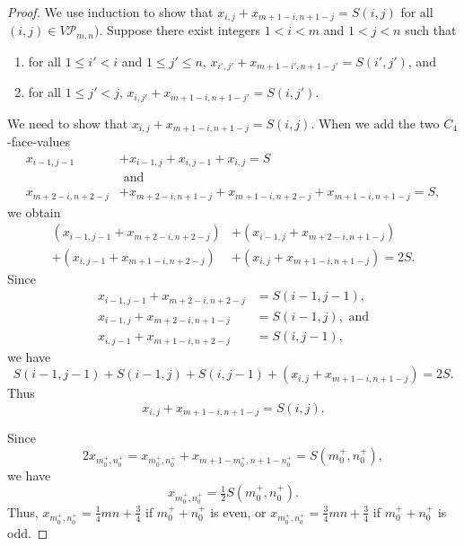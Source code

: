 \documentclass[12pt]{amsart}
\theoremstyle{definition}
\theoremstyle{plain}
\begin{document}
\begin{proof}
We use induction to show that $x_{i,j} + x_{m+1-i,n+1-j} = S(i,j)$ for all $(i,j)\in V\mathcal{P}_{m,n})$.
Suppose there exist integers $1 < i <m$ and $1 < j < n$ such that
\begin{enumerate}
  \item for all $1\leqslant i' <i$ and $1\leqslant j' \leqslant n$, $x_{i',j'} + x_{m+1-i',n+1-j'} = S(i',j')$, and
  \item for all $1\leqslant j' < j$, $x_{i,j'} + x_{m+1-i,n+1-j'} = S(i,j')$.
\end{enumerate}
We need to show that $x_{i,j} + x_{m+1-i,n+1-j} = S(i,j)$.
When we add the two $C_4$-face-values
\begin{align*}
  x_{i-1,j-1} &+ x_{i-1,j} + x_{i,j-1} + x_{i,j} = S \\
  &\mbox{ and } \\
  x_{m+2-i,n+2-j} &+ x_{m+2-i,n+1-j} + x_{m+1-i,n+2-j} + x_{m+1-i,n+1-j} = S,
\end{align*}
we obtain
\begin{align*}
  (x_{i-1,j-1} + x_{m+2-i,n+2-j}) &+ (x_{i-1,j}  + x_{m+2-i,n+1-j} ) \\
  + (x_{i,j-1}+ x_{m+1-i,n+2-j}) &+ (x_{i,j}+ x_{m+1-i,n+1-j}) = 2S.
\end{align*}
Since
\begin{align*}
   x_{i-1,j-1} + x_{m+2-i,n+2-j} &= S(i-1,j-1), \\
   x_{i-1,j}  + x_{m+2-i,n+1-j} &= S(i-1,j), \mbox{ and} \\
   x_{i,j-1}+ x_{m+1-i,n+2-j}  &= S(i,j-1),
\end{align*}
we have
\begin{equation*}
  S(i-1,j-1) + S(i-1,j) + S(i,j-1) + (x_{i,j}+ x_{m+1-i,n+1-j}) = 2S.
\end{equation*}
Thus
\begin{equation*}
x_{i,j} + x_{m+1-i,n+1-j} =S(i,j).
\end{equation*}

Since
\begin{equation*}
  2x_{m_0^{+},n_0^{+}}= x_{m_0^{+},n_0^{+}} + x_{m+1-m_0^{+},n+1-n_0^{+}} = S(m^{+}_0,n^{+}_0),
\end{equation*}
we have
\begin{equation*}
  x_{m_0^{+},n_0^{+}}= \tfrac{1}{2}S(m^{+}_0,n^{+}_0).
\end{equation*}
Thus, $x_{m_0^{+},n_0^{+}}=\tfrac{1}{4}mn+ \tfrac{3}{4}$ if $m^{+}_0 + n^{+}_0$ is even, or
$x_{m_0^{+},n_0^{+}}=\tfrac{3}{4}mn+ \tfrac{3}{4}$ if $m^{+}_0 + n^{+}_0$ is odd.
\end{proof}
\end{document}
